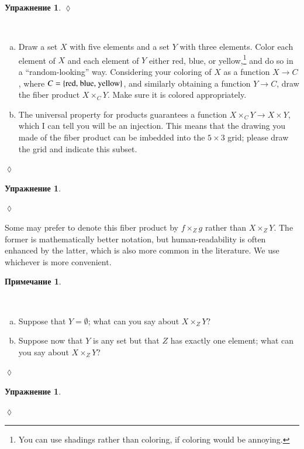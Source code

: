 \documentclass[a4paper]{book}
\def\tn{\textnormal}
\def\to{\rightarrow}
\theoremstyle{myth}
\newtheorem{remarkENG}[envENG]{\begin{english}Remark\end{english}}
\newtheorem{excENG}[envENG]{\begin{english}Exercise\end{english}}
\newenvironment{exerciseENG}{\begin{excENG}}{\hspace*{\fill}$\lozenge$\end{excENG}}
\newtheorem{remarkRUS}[envRUS]{Примечание}
\newtheorem{excRUS}[envRUS]{Упражнение}
\newenvironment{exerciseRUS}{\begin{excRUS}}{\hspace*{\fill}$\lozenge$\end{excRUS}}
\def\sexc{\begin{enumerate}[a.)]\setlength{\itemsep}{.1cm}\setlength{\parskip}{.1cm}\item}
\def\next{\item}
\def\endsexc{\end{enumerate}}
\begin{document}
\begin{russian}
\begin{exerciseRUS}
 
\end{exerciseRUS}

\begin{exerciseENG}~
\sexc Draw a set $X$ with five elements and a set $Y$ with three elements. Color each element of $X$ and each element of $Y$ either red, blue, or yellow,\footnote{You can use shadings rather than coloring, if coloring would be annoying.}
and do so in a “random-looking” way. Considering your coloring of $X$ as a function $X\to C$, where $C=\{\tn{red, blue, yellow}\}$, and similarly obtaining a function $Y\to C$, draw the fiber product $X\times_CY$. Make sure it is colored appropriately.
\next The universal property for products guarantees a function $X\times_CY\to X\times Y$, which I can tell you will be an injection. This means that the drawing you made of the fiber product can be imbedded into the $5\times 3$ grid; please draw the grid and indicate this subset.
\endsexc
\end{exerciseENG}

\begin{exerciseRUS}~
 
\end{exerciseRUS}

\begin{remarkENG}
Some may prefer to denote this fiber product by $f\times_Zg$ rather than $X\times_ZY$. The former is  mathematically better notation, but human-readability is often enhanced by the latter, which is also more common in the literature. We use whichever is more convenient.
\end{remarkENG}

\begin{remarkRUS}
 
\end{remarkRUS}

\begin{exerciseENG}~
\sexc Suppose that $Y=\emptyset$; what can you say about $X\times_ZY$? 
\next Suppose now that $Y$ is any set but that $Z$ has exactly one element; what can you say about $X\times_ZY$?
\endsexc
\end{exerciseENG}

\begin{exerciseRUS}~
 
\end{exerciseRUS}


\end{russian}
\end{document}
